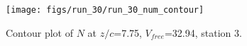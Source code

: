 \begin{figure}[H]
\centering
\texttt{[image: figs/run\_30/run\_30\_num\_contour]}
\caption{Contour plot of $N$ at $z/c$=7.75, $V_{free}$=32.94, station 3.}
\label{fig:run_30_num_contour}
\end{figure}


